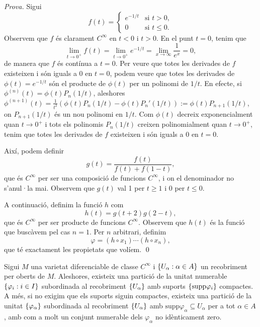 {\color{green!50!black} 
    \textit{Prova.} 
    Sigui
    \begin{equation*}
        f(t) = \begin{cases}
            e^{-1/t} & \text{si } t > 0, \\
            0 & \text{si } t\le 0.
        \end{cases}
    \end{equation*}
    Observem que $f$ és clarament $C^\infty$ en $t<0$ i $t>0$. En el punt $t=0$, tenim que
    \begin{equation*}
        \lim_{t\to0^+} f(t) = \lim_{t\to0^+} e^{-1/t} = \lim_{x\to\infty} \frac{1}{e^x} = 0,
    \end{equation*}
    de manera que $f$ és contínua a $t=0$. Per veure que totes les derivades de $f$ existeixen i són iguals a $0$ en $t=0$, podem veure que totes les derivades de $\phi(t) = e^{-1/t}$ són el producte de $\phi(t)$ per un polinomi de $1/t$. En efecte, si $\phi^{(n)}(t) = \phi(t)P_n(1/t)$, aleshores $\phi^{(n+1)}(t) = \frac{1}{t^2}(\phi(t)P_n(1/t) - \phi(t)P_n'(1/t)) := \phi(t)P_{n+1}(1/t)$, on $P_{n+1}(1/t)$ és un nou polinomi en $1/t$. Com $\phi(t)$ decreix exponencialment quan $t\to0^+$ i tots els polinomis $P_n(1/t)$ creixen polinomialment quan $t\to0^+$, tenim que totes les derivades de $f$ existeixen i són iguals a $0$ en $t=0$.

    Així, podem definir
    \begin{equation*}
        g(t) = \frac{f(t)}{f(t) + f(1-t)},
    \end{equation*}
    que és $C^\infty$ per ser una composició de funcions $C^\infty$, i on el denominador no s'anul·la mai. Observem que $g(t)$ val 1 per $t\ge1$ i 0 per $t\le0$.

    A continuació, definim la funció $h$ com
    \begin{equation*}
        h(t) = g(t+2)g(2-t),
    \end{equation*}
    que és $C^\infty$ per ser producte de funcions $C^\infty$. Observem que $h(t)$ és la funció que buscàvem pel cas $n=1$. Per $n$ arbitrari, definim 
    \begin{equation}\label{eq:phi}
        \varphi = (h\circ x_1)\cdots(h\circ x_n),
    \end{equation}
    que té exactament les propietats que volíem.
    \qed
}

\begin{teo}

    Sigui $M$ una varietat diferenciable de classe $C^\infty$ i $\{U_\alpha:\alpha\in A\}$ un recobriment per oberts de $M$. Aleshores, existeix una partició de la unitat numerable $\{\varphi_i:i\in I\}$ subordinada al recobriment $\{U_\alpha\}$ amb suports $\{\text{supp}\varphi_i\}$ compactes. A més, si no exigim que els suports siguin compactes, existeix una partició de la unitat $\{\varphi_\alpha\}$ subordinada al recobriment $\{U_\alpha\}$ amb $\text{supp}\varphi_\alpha \subseteq U_\alpha$ per a tot $\alpha\in A$, amb com a molt un conjunt numerable dels $\varphi_\alpha$ no idènticament zero.
\end{teo}

